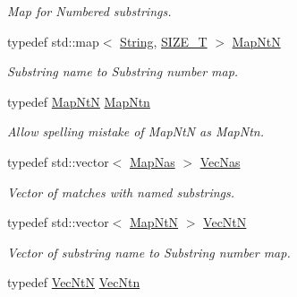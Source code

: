 \begin{DoxyCompactItemize}
\begin{DoxyCompactList}\small\item\em Map for Numbered substrings. \end{DoxyCompactList}\item 
typedef std\+::map$<$ \hyperlink{namespacejpcre2_a91f03070152fb228bc116c5a737f1d16}{String}, \hyperlink{namespacejpcre2_a2aac465ddcb123560c7c8215dd69246c}{S\+I\+Z\+E\+\_\+T} $>$ \hyperlink{namespacejpcre2_a753ebedfb8caf4a16ffbf47d8d705656}{Map\+NtN}\hypertarget{namespacejpcre2_a753ebedfb8caf4a16ffbf47d8d705656}{}\label{namespacejpcre2_a753ebedfb8caf4a16ffbf47d8d705656}

\begin{DoxyCompactList}\small\item\em Substring name to Substring number map. \end{DoxyCompactList}\item 
typedef \hyperlink{namespacejpcre2_a753ebedfb8caf4a16ffbf47d8d705656}{Map\+NtN} \hyperlink{namespacejpcre2_a09243236543ef477ff7f284c52656ef9}{Map\+Ntn}\hypertarget{namespacejpcre2_a09243236543ef477ff7f284c52656ef9}{}\label{namespacejpcre2_a09243236543ef477ff7f284c52656ef9}

\begin{DoxyCompactList}\small\item\em Allow spelling mistake of Map\+NtN as Map\+Ntn. \end{DoxyCompactList}\item 
typedef std\+::vector$<$ \hyperlink{namespacejpcre2_a20bd901c9ca3c949806aa6b9e324f6cf}{Map\+Nas} $>$ \hyperlink{namespacejpcre2_a2b121ae776ea5b2913839f418a7d856b}{Vec\+Nas}\hypertarget{namespacejpcre2_a2b121ae776ea5b2913839f418a7d856b}{}\label{namespacejpcre2_a2b121ae776ea5b2913839f418a7d856b}

\begin{DoxyCompactList}\small\item\em Vector of matches with named substrings. \end{DoxyCompactList}\item 
typedef std\+::vector$<$ \hyperlink{namespacejpcre2_a753ebedfb8caf4a16ffbf47d8d705656}{Map\+NtN} $>$ \hyperlink{namespacejpcre2_a88a7aaf84cad627d34c8152e726168eb}{Vec\+NtN}\hypertarget{namespacejpcre2_a88a7aaf84cad627d34c8152e726168eb}{}\label{namespacejpcre2_a88a7aaf84cad627d34c8152e726168eb}

\begin{DoxyCompactList}\small\item\em Vector of substring name to Substring number map. \end{DoxyCompactList}\item 
typedef \hyperlink{namespacejpcre2_a88a7aaf84cad627d34c8152e726168eb}{Vec\+NtN} \hyperlink{namespacejpcre2_a8d6b7b4c873bc7cb4626f950d2b40f9d}{Vec\+Ntn}\hypertarget{namespacejpcre2_a8d6b7b4c873bc7cb4626f950d2b40f9d}{}\label{namespacejpcre2_a8d6b7b4c873bc7cb4626f950d2b40f9d}


\end{DoxyCompactItemize}
